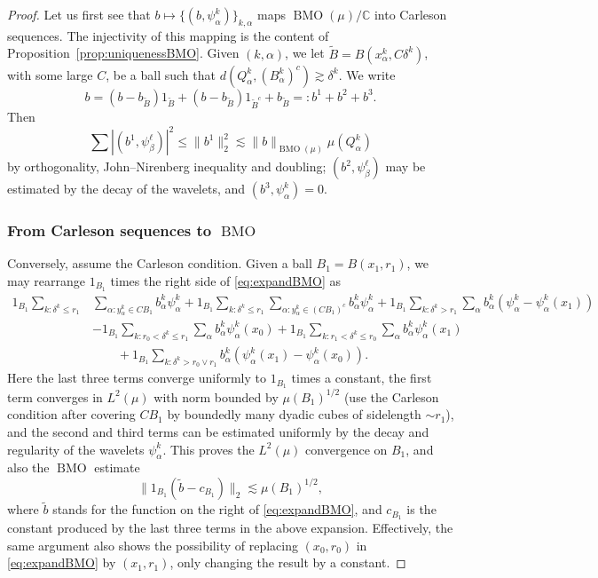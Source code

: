 \documentclass{amsart}
\numberwithin{equation}{section}
\theoremstyle{plain}
\theoremstyle{definition}
\theoremstyle{remark}
\begin{document}
{{{\begin{proof}
Let us first see that $b\mapsto\{(b,\psi^k_\alpha)\}_{k,\alpha}$ maps ${\operatorname{BMO}}(\mu)/{\mathbb{C}}$ into Carleson sequences. The injectivity of this mapping is the content of Proposition~\ref{prop:uniquenessBMO}.
Given $(k,\alpha)$, we let $\tilde{B}=B(x^k_\alpha,C\delta^k)$, with some large $C$, be a ball such that $d(Q^k_\alpha,(B^k_\alpha)^c)\gtrsim\delta^k$. We write
\begin{equation*}
   b=(b-b_{\tilde{B}})1_{\tilde{B}}+(b-b_{\tilde{B}})1_{\tilde{B}^c}+b_{\tilde{B}}=:b^1+b^2+b^3.
\end{equation*}
Then
\begin{equation*}
  \sum|(b^1,\psi^\ell_\beta)|^2\leq\|b^1\|_2^2\lesssim\|b\|_{{\operatorname{BMO}}(\mu)}\mu(Q^k_\alpha)
\end{equation*}
by orthogonality, John--Nirenberg inequality and doubling; $(b^2,\psi^\ell_\beta)$ may be estimated by the decay of the wavelets, and $(b^3,\psi^k_\alpha)=0$.

\subsubsection*{From Carleson sequences to ${\operatorname{BMO}}$}
Conversely, assume the Carleson condition. Given a ball $B_1=B(x_1,r_1)$, we may rearrange $1_{B_1}$ times the right side of \eqref{eq:expandBMO} as
\begin{equation*}
\begin{split}
  1_{B_1}\sum_{k:\delta^k\leq r_1} &\sum_{\alpha:y^k_\alpha\in CB_1} b^k_\alpha\psi^k_\alpha
  +1_{B_1}\sum_{k:\delta^k\leq r_1}\sum_{\alpha:y^k_\alpha\in (CB_1)^c} b^k_\alpha\psi^k_\alpha
  +1_{B_1}\sum_{k:\delta^k>r_1}\sum_{\alpha}b^k_\alpha(\psi^k_\alpha-\psi^k_\alpha(x_1)) \\
  &-1_{B_1} \sum_{k:r_0<\delta^k\leq r_1}\sum_\alpha b^k_\alpha\psi^k_\alpha(x_0)
    +1_{B_1} \sum_{k:r_1<\delta^k\leq r_0}\sum_\alpha b^k_\alpha\psi^k_\alpha(x_1) \\
   &\qquad+1_{B_1} \sum_{k:\delta^k>r_0\vee r_1}b^k_\alpha(\psi^k_\alpha(x_1)-\psi^k_\alpha(x_0)).
\end{split}
\end{equation*}
Here the last three terms converge uniformly to $1_{B_1}$ times a constant, the first term converges in $L^2(\mu)$ with norm bounded by $\mu(B_1)^{1/2}$ (use the Carleson condition after covering $CB_1$ by boundedly many dyadic cubes of sidelength $\sim r_1$), and the second and third terms can be estimated uniformly by the decay and regularity of the wavelets $\psi^k_\alpha$. This proves the $L^2(\mu)$ convergence on $B_1$, and also the ${\operatorname{BMO}}$ estimate
\begin{equation*}
  {\|{1_{B_1}(\tilde{b}-c_{B_1})}\|_{{2}}}\lesssim\mu(B_1)^{1/2},
\end{equation*}
where $\tilde{b}$ stands for the function on the right of \eqref{eq:expandBMO}, and $c_{B_1}$ is the constant produced by the last three terms in the above expansion. Effectively, the same argument also shows the possibility of replacing $(x_0,r_0)$ in \eqref{eq:expandBMO} by $(x_1,r_1)$, only changing the result by a constant.


\end{proof}}}}
\end{document}
